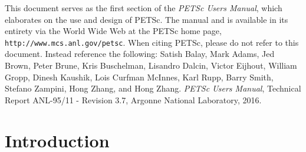 \vspace{1.0cm}



 This document serves as the first section of the {\em PETSc Users
Manual}, which elaborates on the use and design of PETSc. The
manual and is available in its entirety via the World Wide Web at
the PETSc home page, {\tt http://www.mcs.anl.gov/petsc}.
When citing PETSc, please do
not refer to this document. Instead reference the following: Satish
Balay, Mark Adams, Jed Brown, Peter Brune, Kris Buschelman, Lisandro Dalcin, Victor Eijhout, William Gropp, Dinesh Kaushik,
Lois Curfman McInnes, Karl Rupp, Barry Smith, Stefano Zampini, Hong Zhang, and Hong Zhang.  {\em
PETSc Users Manual}, Technical Report ANL-95/11 - Revision 3.7,
Argonne National Laboratory, 2016.

%
\newpage


\newpage
\section{Introduction}



